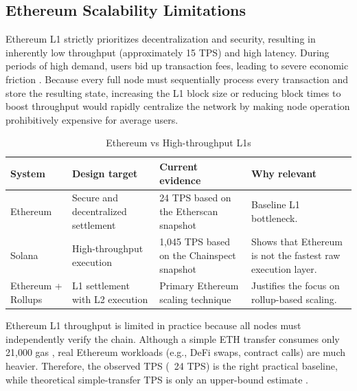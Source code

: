 \subsection{Ethereum Scalability Limitations}
Ethereum L1 strictly prioritizes decentralization and security, resulting in inherently low throughput (approximately 15 TPS) and high latency. During periods of high demand, users bid up transaction fees, leading to severe economic friction \citep{buterin2014ethereum}. Because every full node must sequentially process every transaction and store the resulting state, increasing the L1 block size or reducing block times to boost throughput would rapidly centralize the network by making node operation prohibitively expensive for average users.
\begin{table}[H]
\centering
\caption{Ethereum vs High-throughput L1s}
\label{tab:ethereum_vs_high_throughput_l1s}
\compacttable
\begin{tabularx}{\textwidth}{@{}p{}Y Y Y@{}}
\toprule
\textbf{System} & \textbf{Design target} & \textbf{Current evidence} & \textbf{Why relevant} \\
\midrule
Ethereum & Secure and decentralized settlement & 24 TPS based on the Etherscan snapshot~\citep{etherscan_tps} & Baseline L1 bottleneck. \\
Solana & High-throughput execution & 1,045 TPS based on the Chainspect snapshot~\citep{chainspect_tps} & Shows that Ethereum is not the fastest raw execution layer. \\
Ethereum + Rollups & L1 settlement with L2 execution & Primary Ethereum scaling technique~\citep{ethdocs_scaling} & Justifies the focus on rollup-based scaling. \\
\bottomrule
\end{tabularx}
\end{table}
\normalsize

Ethereum L1 throughput is limited in practice because all nodes must independently verify the chain. Although a simple ETH transfer consumes only 21,000 gas \citep{ethdocs_gas}, real Ethereum workloads (e.g., DeFi swaps, contract calls) are much heavier. Therefore, the observed TPS (~24 TPS) is the right practical baseline, while theoretical simple-transfer TPS is only an upper-bound estimate \citep{etherscan_tps, ethdocs_gas}.
